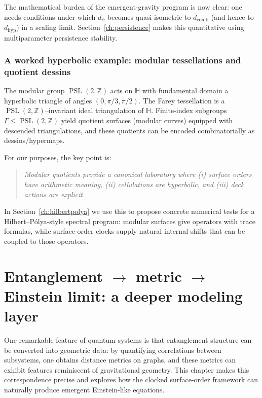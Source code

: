 \documentclass[11pt,oneside]{amsbook}
\numberwithin{equation}{section}
\theoremstyle{plain}
\theoremstyle{definition}
\theoremstyle{remark}
\newcommand{\HH}{\mathbb{H}}
\newcommand{\Z}{\mathbb{Z}}
\DeclareMathOperator{\PSL}{\mathrm{PSL}}
\begin{document}
The mathematical burden of the emergent-gravity program is now clear:
one needs conditions under which $d_\psi$ becomes quasi-isometric to $d_{\mathrm{comb}}$ (and hence to $d_{\mathrm{hyp}}$) in a scaling limit.
Section~\ref{ch:persistence} makes this quantitative using multiparameter persistence stability.

\subsection{A worked hyperbolic example: modular tessellations and quotient dessins}
\label{sec:worked_modular}

The modular group $\PSL(2,\Z)$ acts on $\HH$ with fundamental domain a hyperbolic triangle of angles $(0,\pi/3,\pi/2)$.
The Farey tessellation is a $\PSL(2,\Z)$--invariant ideal triangulation of $\HH$.
Finite-index subgroups $\Gamma\le\PSL(2,\Z)$ yield quotient surfaces (modular curves) equipped with descended triangulations, and these quotients can be encoded combinatorially as dessins/hypermaps.

For our purposes, the key point is:

\begin{quote}
\emph{Modular quotients provide a canonical laboratory where (i) surface orders have arithmetic meaning, (ii) cellulations are hyperbolic, and (iii) deck actions are explicit.}
\end{quote}

In Section~\ref{ch:hilbertpolya} we use this to propose concrete numerical tests for a Hilbert--Pólya-style spectral program: modular surfaces give operators with trace formulas, while surface-order clocks supply natural internal shifts that can be coupled to those operators.


\chapter{Entanglement \texorpdfstring{$\to$}{->} metric \texorpdfstring{$\to$}{->} Einstein limit: a deeper modeling layer}

\label{ch:gravity}

One remarkable feature of quantum systems is that entanglement structure can be converted into geometric data: by quantifying correlations between subsystems, one obtains distance metrics on graphs, and these metrics can exhibit features reminiscent of gravitational geometry. This chapter makes this correspondence precise and explores how the clocked surface-order framework can naturally produce emergent Einstein-like equations.
\end{document}
